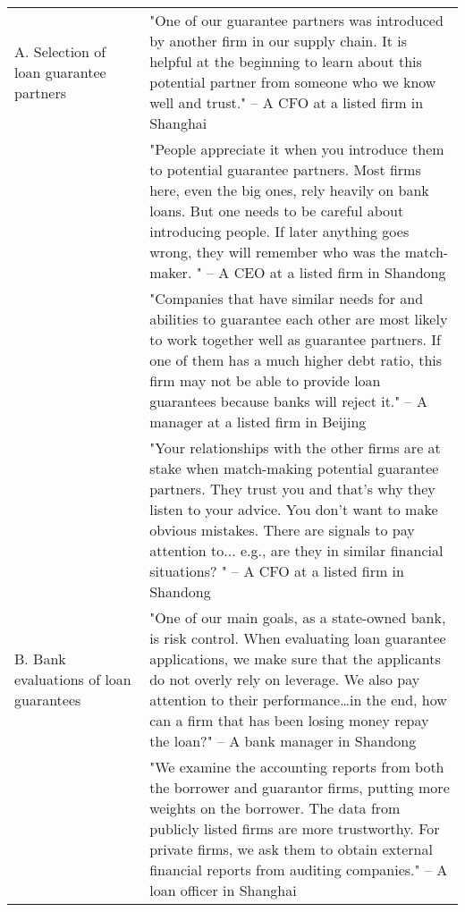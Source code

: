 \begin{singlespace}
\begin{center}
\begin{longtable}[c]{p{0.3\linewidth} | p{0.7\linewidth}}
A. Selection of loan guarantee partners                  & "One of our guarantee partners was introduced by another firm in our supply chain. It is helpful at the beginning to learn about this potential partner from someone who we know   well and trust." -- A CFO at a listed firm in Shanghai                                                                                                                          \\ \cline{2-2} 
                                                                             & "People appreciate it when   you introduce them to potential guarantee partners. Most firms here, even the   big ones, rely heavily on bank loans. But one needs to be careful about   introducing people. If later anything goes wrong, they will remember  who was the match-maker. " -- A CEO at a listed firm in Shandong                               \\ \cline{2-2} 
                                                                             & "Companies that have  similar needs for and abilities to guarantee each other are most likely to work together well as guarantee partners. If one of them has a much higher debt ratio,   this firm may not be able to provide loan guarantees because banks will reject   it." -- A manager at a listed firm in Beijing                                                 \\ \cline{2-2} 
                                                                             & "Your relationships with   the other firms are at stake when match-making potential guarantee partners.   They trust you and that's why they listen to your advice. You don't want to   make obvious mistakes. There are signals to pay attention to... e.g., are   they in similar financial situations? " -- A CFO at a listed firm in   Shandong                \\ \hline
B. Bank evaluations of loan guarantees                     & "One of our main goals, as   a state-owned bank, is risk control. When evaluating loan guarantee   applications, we make sure that the applicants  do not overly rely on leverage. We also pay   attention to their performance…in the end, how can a firm that has been   losing money repay the loan?" -- A bank manager in Shandong                             \\ \cline{2-2} 
                                                                             & "We examine the accounting   reports from both the borrower and guarantor firms, putting more weights on   the borrower. The data from publicly listed firms are more trustworthy. For   private firms, we ask them to obtain external financial reports from auditing   companies." -- A loan officer in Shanghai                                                 \\ \cline{2-2} 

\end{longtable}
\end{center}
\end{singlespace}
